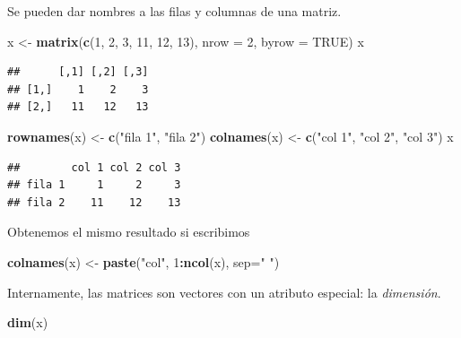 \documentclass[]{book}
\newenvironment{Shaded}{\begin{snugshade}}{\end{snugshade}}
\newcommand{\DataTypeTok}[1]{\textcolor[rgb]{0.13,0.29,0.53}{#1}}
\newcommand{\DecValTok}[1]{\textcolor[rgb]{0.00,0.00,0.81}{#1}}
\newcommand{\KeywordTok}[1]{\textcolor[rgb]{0.13,0.29,0.53}{\textbf{#1}}}
\newcommand{\NormalTok}[1]{#1}
\newcommand{\OperatorTok}[1]{\textcolor[rgb]{0.81,0.36,0.00}{\textbf{#1}}}
\newcommand{\OtherTok}[1]{\textcolor[rgb]{0.56,0.35,0.01}{#1}}
\newcommand{\StringTok}[1]{\textcolor[rgb]{0.31,0.60,0.02}{#1}}
\begin{document}
Se pueden dar nombres a las filas y columnas de una matriz.

\begin{Shaded}
\begin{Highlighting}[]
\NormalTok{x <-}\StringTok{ }\KeywordTok{matrix}\NormalTok{(}\KeywordTok{c}\NormalTok{(}\DecValTok{1}\NormalTok{, }\DecValTok{2}\NormalTok{, }\DecValTok{3}\NormalTok{, }\DecValTok{11}\NormalTok{, }\DecValTok{12}\NormalTok{, }\DecValTok{13}\NormalTok{), }\DataTypeTok{nrow =} \DecValTok{2}\NormalTok{, }\DataTypeTok{byrow =} \OtherTok{TRUE}\NormalTok{)}
\NormalTok{x}
\end{Highlighting}
\end{Shaded}

\begin{verbatim}
##      [,1] [,2] [,3]
## [1,]    1    2    3
## [2,]   11   12   13
\end{verbatim}

\begin{Shaded}
\begin{Highlighting}[]
\KeywordTok{rownames}\NormalTok{(x) <-}\StringTok{ }\KeywordTok{c}\NormalTok{(}\StringTok{"fila 1"}\NormalTok{, }\StringTok{"fila 2"}\NormalTok{)}
\KeywordTok{colnames}\NormalTok{(x) <-}\StringTok{ }\KeywordTok{c}\NormalTok{(}\StringTok{"col 1"}\NormalTok{, }\StringTok{"col 2"}\NormalTok{, }\StringTok{"col 3"}\NormalTok{)}
\NormalTok{x }
\end{Highlighting}
\end{Shaded}

\begin{verbatim}
##        col 1 col 2 col 3
## fila 1     1     2     3
## fila 2    11    12    13
\end{verbatim}

Obtenemos el mismo resultado si escribimos

\begin{Shaded}
\begin{Highlighting}[]
\KeywordTok{colnames}\NormalTok{(x) <-}\StringTok{ }\KeywordTok{paste}\NormalTok{(}\StringTok{"col"}\NormalTok{, }\DecValTok{1}\OperatorTok{:}\KeywordTok{ncol}\NormalTok{(x), }\DataTypeTok{sep=}\StringTok{" "}\NormalTok{)}
\end{Highlighting}
\end{Shaded}

Internamente, las matrices son vectores con un atributo especial: la \emph{dimensión}.

\begin{Shaded}
\begin{Highlighting}[]
\KeywordTok{dim}\NormalTok{(x)}
\end{Highlighting}
\end{Shaded}
\end{document}
